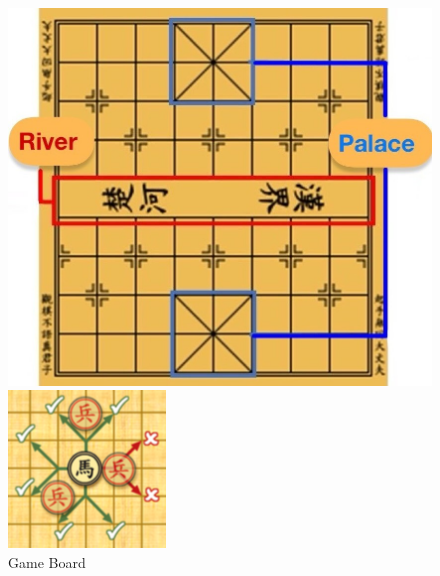 \documentclass[12pt,a4paper]{article}
\begin{document}
\begin{figure}[htbp]
    \centering
    \begin{minipage}[b]{0.3\textwidth}
        \centering
        \includegraphics[width=\linewidth]{Xiangqi.assets/Board.jpg}
        \caption{Game Board}
    \end{minipage}
    \begin{minipage}[b]{0.25\textwidth}
        \centering
        \includegraphics[width=\linewidth]{Xiangqi.assets/180px-MovementOfHorsePiece.png}

\end{minipage}
\end{figure}
\end{document}
